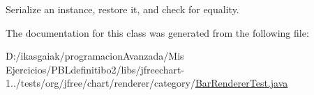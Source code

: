 Serialize an instance, restore it, and check for equality. 

The documentation for this class was generated from the following file\+:\begin{DoxyCompactItemize}
\item 
D\+:/ikasgaiak/programacion\+Avanzada/\+Mis Ejercicios/\+P\+B\+Ldefinitibo2/libs/jfreechart-\/1../tests/org/jfree/chart/renderer/category/\mbox{\hyperlink{_bar_renderer_test_8java}{Bar\+Renderer\+Test.\+java}}\end{DoxyCompactItemize}
